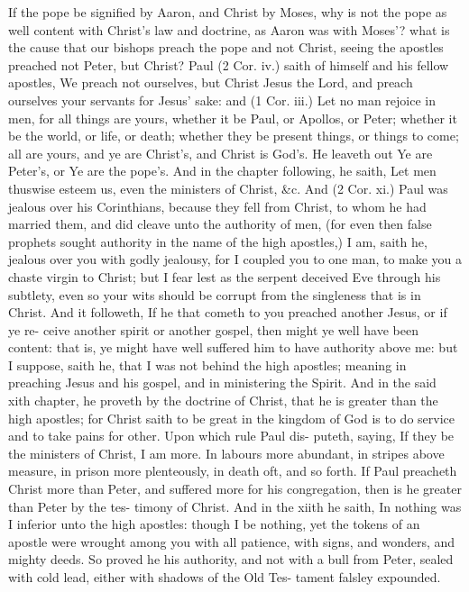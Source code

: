 \documentclass{custom}
\begin{document}
If the pope be signified by Aaron, and Christ by Moses, 
why is not the pope as well content with Christ's law and 
doctrine, as Aaron was with Moses'? what is the cause 
that our bishops preach the pope and not Christ, seeing 
the apostles preached not Peter, but Christ? Paul (2 
Cor. iv.) saith of himself and his fellow apostles, We 
preach not ourselves, but Christ Jesus the Lord, and preach 
ourselves your servants for Jesus' sake: and (1 Cor. iii.) 
Let no man rejoice in men, for all things are yours, whether 
it be Paul, or Apollos, or Peter; whether it be the world, 
or life, or death; whether they be present things, or things 
to come; all are yours, and ye are Christ's, and 
Christ is God's. He leaveth out Ye are Peter's, or Ye are 
the pope's. And in the chapter following, he saith, Let men 
thuswise esteem us, even the ministers of Christ, &c. And 
(2 Cor. xi.) Paul was jealous over his Corinthians, because 
they fell from Christ, to whom he had married them, and 
did cleave unto the authority of men, (for even then false 
prophets sought authority in the name of the high apostles,) 
I am, saith he, jealous over you with godly jealousy, for I 
coupled you to one man, to make you a chaste virgin to 
Christ; but I fear lest as the serpent deceived Eve 
through his subtlety, even so your wits should be corrupt 
from the singleness that is in Christ. And it followeth, If 
he that cometh to you preached another Jesus, or if ye re- 
ceive another spirit or another gospel, then might ye well 
have been content: that is, ye might have well suffered him 
to have authority above me: but I suppose, saith he, that 
I was not behind the high apostles; meaning in preaching 
Jesus and his gospel, and in ministering the Spirit. And 
in the said xith chapter, he proveth by the doctrine of 
Christ, that he is greater than the high apostles; for Christ 
saith to be great in the kingdom of God is to do service 
and to take pains for other. Upon which rule Paul dis- 
puteth, saying, If they be the ministers of Christ, I am more. 
In labours more abundant, in stripes above measure, in 
prison more plenteously, in death oft, and so forth. If Paul 
preacheth Christ more than Peter, and suffered more for 
his congregation, then is he greater than Peter by the tes- 
timony of Christ. And in the xiith he saith, In nothing was 
I inferior unto the high apostles: though I be nothing, yet 
the tokens of an apostle were wrought among you with all 
patience, with signs, and wonders, and mighty deeds. So 
proved he his authority, and not with a bull from Peter, 
sealed with cold lead, either with shadows of the Old Tes- 
tament falsley expounded. 
\end{document}
